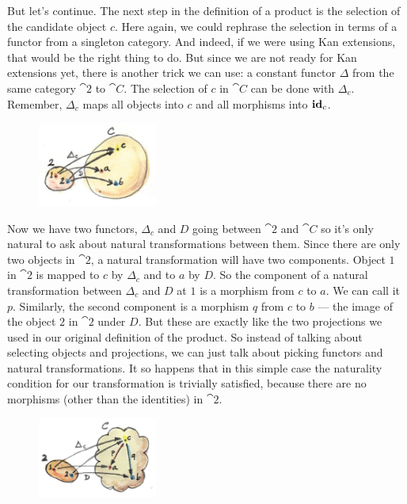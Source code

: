 \noindent
But let's continue. The next step in the definition of a product is the
selection of the candidate object $c$. Here again, we could
rephrase the selection in terms of a functor from a singleton category.
And indeed, if we were using Kan extensions, that would be the right
thing to do. But since we are not ready for Kan extensions yet, there is
another trick we can use: a constant functor $\Delta$ from the same category
$\cat{2}$ to $\cat{C}$. The selection of $c$ in $\cat{C}$ can be
done with $\Delta_c$. Remember, $\Delta_c$ maps all
objects into $c$ and all morphisms into $\idarrow[c]$.

\begin{figure}[H]
  \centering
  \includegraphics[width=0.35\textwidth]{images/twodelta.jpg}
\end{figure}

\noindent
Now we have two functors, $\Delta_c$ and $D$ going between
$\cat{2}$ and $\cat{C}$ so it's only natural to ask about natural
transformations between them. Since there are only two objects in
$\cat{2}$, a natural transformation will have two components. Object $1$
in $\cat{2}$ is mapped to $c$ by $\Delta_c$ and to
$a$ by $D$. So the component of a natural transformation between
$\Delta_c$ and $D$ at $1$ is a morphism from $c$ to
$a$. We can call it $p$. Similarly, the second component
is a morphism $q$ from $c$ to $b$ --- the image of
the object $2$ in $\cat{2}$ under $D$. But these are exactly like the two
projections we used in our original definition of the product. So
instead of talking about selecting objects and projections, we can just
talk about picking functors and natural transformations. It so happens
that in this simple case the naturality condition for our transformation
is trivially satisfied, because there are no morphisms (other than the
identities) in $\cat{2}$.

\begin{figure}[H]
  \centering
  \includegraphics[width=0.35\textwidth]{images/productcone.jpg}
\end{figure}

